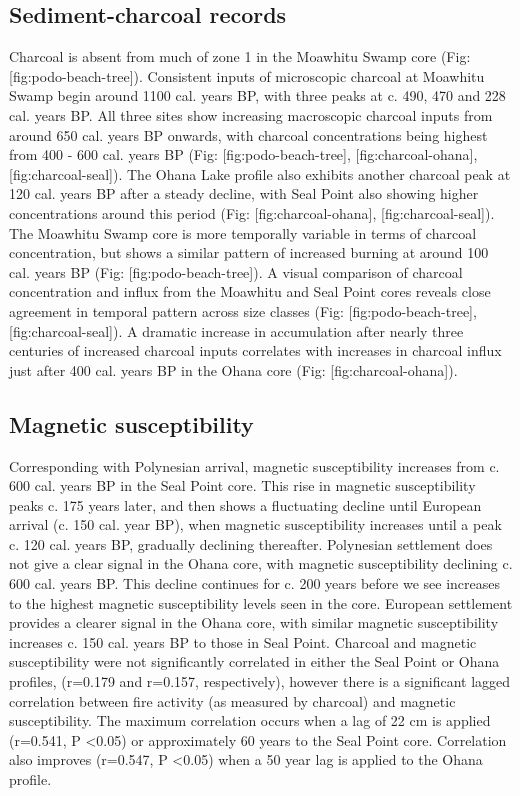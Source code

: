 \documentclass[]{article}
\begin{document}
\subsection{Sediment-charcoal records}\label{sediment-charcoal-records}

Charcoal is absent from much of zone 1 in the Moawhitu Swamp core (Fig: {[}fig:podo-beach-tree{]}). Consistent inputs of microscopic charcoal at Moawhitu Swamp begin around 1100 cal. years BP, with three peaks at c. 490, 470 and 228 cal. years BP. All three sites show increasing macroscopic charcoal inputs from around 650 cal. years BP onwards, with charcoal concentrations being highest from 400 - 600 cal. years BP (Fig: {[}fig:podo-beach-tree{]}, {[}fig:charcoal-ohana{]}, {[}fig:charcoal-seal{]}). The Ohana Lake profile also exhibits another charcoal peak at 120 cal. years BP after a steady decline, with Seal Point also showing higher concentrations around this period (Fig: {[}fig:charcoal-ohana{]}, {[}fig:charcoal-seal{]}). The Moawhitu Swamp core is more temporally variable in terms of charcoal concentration, but shows a similar pattern of increased burning at around 100 cal. years BP (Fig: {[}fig:podo-beach-tree{]}). A visual comparison of charcoal concentration and influx from the Moawhitu and Seal Point cores reveals close agreement in temporal pattern across size classes (Fig: {[}fig:podo-beach-tree{]}, {[}fig:charcoal-seal{]}). A dramatic increase in accumulation after nearly three centuries of increased charcoal inputs correlates with increases in charcoal influx just after 400 cal. years BP in the Ohana core (Fig: {[}fig:charcoal-ohana{]}).

\subsection{Magnetic susceptibility}\label{magnetic-susceptibility-1}

Corresponding with Polynesian arrival, magnetic susceptibility increases from c. 600 cal. years BP in the Seal Point core. This rise in magnetic susceptibility peaks c. 175 years later, and then shows a fluctuating decline until European arrival (c. 150 cal. year BP), when magnetic susceptibility increases until a peak c. 120 cal. years BP, gradually declining thereafter. Polynesian settlement does not give a clear signal in the Ohana core, with magnetic susceptibility declining c. 600 cal. years BP. This decline continues for c. 200 years before we see increases to the highest magnetic susceptibility levels seen in the core. European settlement provides a clearer signal in the Ohana core, with similar magnetic susceptibility increases c. 150 cal. years BP to those in Seal Point. Charcoal and magnetic susceptibility were not significantly correlated in either the Seal Point or Ohana profiles, (r=0.179 and r=0.157, respectively), however there is a significant lagged correlation between fire activity (as measured by charcoal) and magnetic susceptibility. The maximum correlation occurs when a lag of 22 cm is applied (r=0.541, P \textless{}0.05) or approximately 60 years to the Seal Point core. Correlation also improves (r=0.547, P \textless{}0.05) when a 50 year lag is applied to the Ohana profile.
\end{document}
